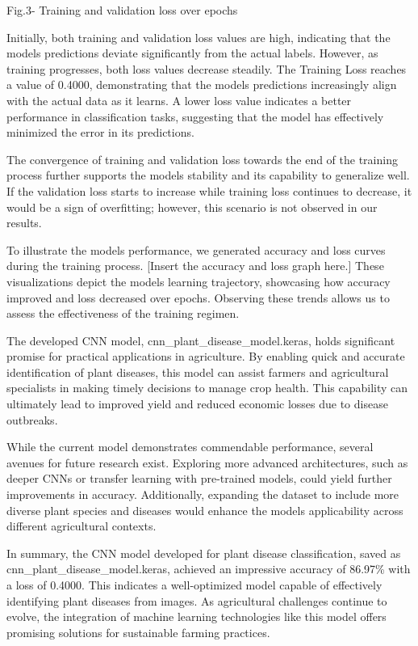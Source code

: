 \documentclass[
]{article}
\begin{document}
Fig.3- Training and validation loss over epochs

Initially, both training and validation loss values are high, indicating
that the model\textquotesingle s predictions deviate significantly from
the actual labels. However, as training progresses, both loss values
decrease steadily. The Training Loss reaches a value of 0.4000,
demonstrating that the model\textquotesingle s predictions increasingly
align with the actual data as it learns. A lower loss value indicates a
better performance in classification tasks, suggesting that the model
has effectively minimized the error in its predictions.

The convergence of training and validation loss towards the end of the
training process further supports the model\textquotesingle s stability
and its capability to generalize well. If the validation loss starts to
increase while training loss continues to decrease, it would be a sign
of overfitting; however, this scenario is not observed in our results.

To illustrate the model\textquotesingle s performance, we generated
accuracy and loss curves during the training process. {[}Insert the
accuracy and loss graph here.{]} These visualizations depict the
model\textquotesingle s learning trajectory, showcasing how accuracy
improved and loss decreased over epochs. Observing these trends allows
us to assess the effectiveness of the training regimen.

The developed CNN model, cnn\_plant\_disease\_model.keras, holds
significant promise for practical applications in agriculture. By
enabling quick and accurate identification of plant diseases, this model
can assist farmers and agricultural specialists in making timely
decisions to manage crop health. This capability can ultimately lead to
improved yield and reduced economic losses due to disease outbreaks.

While the current model demonstrates commendable performance, several
avenues for future research exist. Exploring more advanced
architectures, such as deeper CNNs or transfer learning with pre-trained
models, could yield further improvements in accuracy. Additionally,
expanding the dataset to include more diverse plant species and diseases
would enhance the model\textquotesingle s applicability across different
agricultural contexts.

In summary, the CNN model developed for plant disease classification,
saved as cnn\_plant\_disease\_model.keras, achieved an impressive
accuracy of 86.97\% with a loss of 0.4000. This indicates a
well-optimized model capable of effectively identifying plant diseases
from images. As agricultural challenges continue to evolve, the
integration of machine learning technologies like this model offers
promising solutions for sustainable farming practices.
\end{document}
